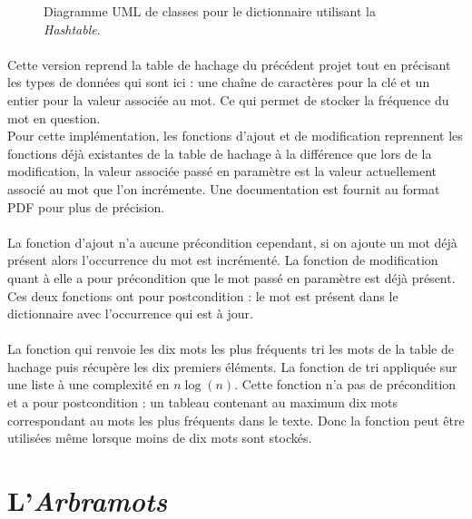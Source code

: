 \documentclass[12pt,a4paper,final]{article}
\begin{document}
	\begin{figure}[h]
		\hspace{-1.8cm}
		
		\caption{Diagramme UML de classes pour le dictionnaire utilisant la \emph{Hashtable}.}
		\label{hashtable_uml}
	\end{figure}
		
	\paragraph{}{Cette version reprend la table de hachage du précédent projet tout en précisant les types de données qui sont ici : une chaîne de caractères pour la clé et un entier pour la valeur associée au mot. Ce qui permet de stocker la fréquence du mot en question. \\
Pour cette implémentation, les fonctions d'ajout et de modification reprennent les fonctions déjà existantes de la table de hachage à la différence que lors de la modification, la valeur associée passé en paramètre est la valeur actuellement associé au mot que l'on incrémente. Une documentation est fournit au format PDF pour plus de précision.}
    \paragraph{}{La fonction d'ajout n'a aucune précondition cependant, si on ajoute un mot déjà présent alors l’occurrence du mot est incrémenté. La fonction de modification quant à elle a pour précondition que le mot passé en paramètre est déjà présent. Ces deux fonctions ont pour postcondition : le mot est présent dans le dictionnaire avec l'occurrence qui est à jour.}

	\paragraph{}{La fonction qui renvoie les dix mots les plus fréquents tri les mots de la table de hachage puis récupère les dix premiers éléments. La fonction de tri appliquée sur une liste à une complexité en $n\log(n)$. Cette fonction n'a pas de précondition et a pour postcondition : un tableau contenant au maximum dix mots correspondant au mots les plus fréquents dans le texte. Donc la fonction peut être utilisées même lorsque moins de dix mots sont stockés.}
	
\newpage 

\section{L'\emph{Arbramots}}
\end{document}
